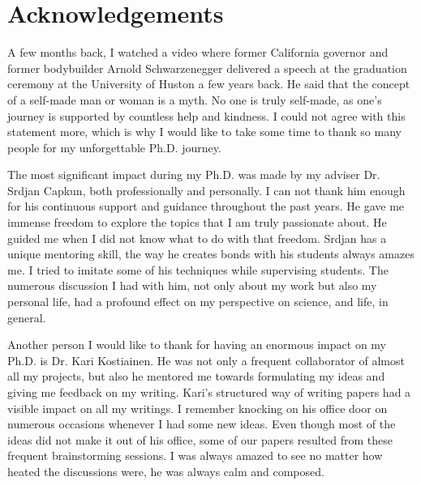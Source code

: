 
\bigskip

\begingroup
\let\clearpage\relax
\let\cleardoublepage\relax
\let\cleardoublepage\relax
\chapter*{Acknowledgements}

\def\thanks#1{%
\begingroup
\leftskip1em
\noindent #1
\par
\endgroup
}

A few months back, I watched a video where former California governor and former bodybuilder Arnold Schwarzenegger delivered a speech at the graduation ceremony at the University of Huston a few years back. He said that the concept of a self-made man or woman is a myth. No one is truly self-made, as one's journey is supported by countless help and kindness. I could not agree with this statement more, which is why I would like to take some time to thank so many people for my unforgettable Ph.D. journey.


The most significant impact during my Ph.D. was made by my adviser Dr. Srdjan Capkun, both professionally and personally. I can not thank him enough for his continuous support and guidance throughout the past years. He gave me immense freedom to explore the topics that I am truly passionate about. He guided me when I did not know what to do with that freedom. Srdjan has a unique mentoring skill, the way he creates bonds with his students always amazes me. I tried to imitate some of his techniques while supervising students. The numerous discussion I had with him, not only about my work but also my personal life, had a profound effect on my perspective on science, and life, in general.


Another person I would like to thank for having an enormous impact on my Ph.D. is Dr. Kari Kostiainen. He was not only a frequent collaborator of almost all my projects, but also he mentored me towards formulating my ideas and giving me feedback on my writing.  Kari's structured way of writing papers had a visible impact on all my writings. I remember knocking on his office door on numerous occasions whenever I had some new ideas. Even though most of the ideas did not make it out of his office, some of our papers resulted from these frequent brainstorming sessions. I was always amazed to see no matter how heated the discussions were, he was always calm and composed.

